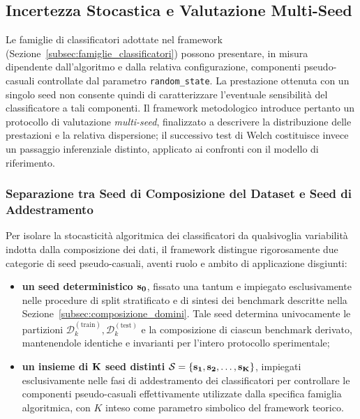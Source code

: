 \subsection{Incertezza Stocastica e Valutazione Multi-Seed}
\label{subsec:stabilita_stocastica}

Le famiglie di classificatori adottate nel framework (Sezione~\ref{subsec:famiglie_classificatori}) possono presentare, in misura dipendente dall'algoritmo e dalla relativa configurazione, componenti pseudo-casuali controllate dal parametro \texttt{random\_state}. La prestazione ottenuta con un singolo seed non consente quindi di caratterizzare l'eventuale sensibilità del classificatore a tali componenti. Il framework metodologico introduce pertanto un protocollo di valutazione \textit{multi-seed}, finalizzato a descrivere la distribuzione delle prestazioni e la relativa dispersione; il successivo test di Welch costituisce invece un passaggio inferenziale distinto, applicato ai confronti con il modello di riferimento.

\subsubsection{Separazione tra Seed di Composizione del Dataset e Seed di Addestramento}
\label{subsubsec:seed_separation}
Per isolare la stocasticità algoritmica dei classificatori da qualsivoglia variabilità indotta dalla composizione dei dati, il framework distingue rigorosamente due categorie di seed pseudo-casuali, aventi ruolo e ambito di applicazione disgiunti:
\begin{itemize}
    \item \textbf{un seed deterministico $\bf{s_0}$}, fissato una tantum e impiegato esclusivamente nelle procedure di split stratificato e di sintesi dei benchmark descritte nella Sezione~\ref{subsec:composizione_domini}. Tale seed determina univocamente le partizioni $\mathcal{D}_k^{(\text{train})}, \mathcal{D}_k^{(\text{test})}$ e la composizione di ciascun benchmark derivato, mantenendole identiche e invarianti per l'intero protocollo sperimentale;
    \item \textbf{un insieme di $\bf{K}$ seed distinti $\bf{\mathcal{S} = \{s_1, s_2, \dots, s_K\}}$}, impiegati esclusivamente nelle fasi di addestramento dei classificatori per controllare le componenti pseudo-casuali effettivamente utilizzate dalla specifica famiglia algoritmica, con $K$ inteso come parametro simbolico del framework teorico.
\end{itemize}

